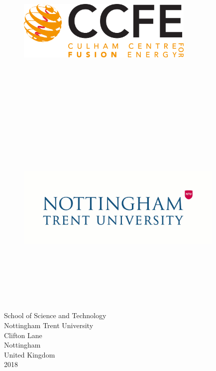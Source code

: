 \documentclass[12pt,a4paper,oneside]{report}
\begin{document}
\begin{titlepage}
\begin{figure}[H]
\centering
\includegraphics[width=8.5cm, height=8.5cm, keepaspectratio]{Images/CCFElogo.jpg}
\includegraphics[width=10cm, height=10cm, keepaspectratio]{Images/ntulogo.jpg}
\end{figure}    

\large{School of Science and Technology} \\
\large{Nottingham Trent University} \\
\large{Clifton Lane} \\
\large{Nottingham} \\
\large{United Kingdom} \\
\vspace{1cm}
\large{2018}
\end{titlepage}


\tableofcontents
\pagebreak
\clearpage
{}
\end{document}
